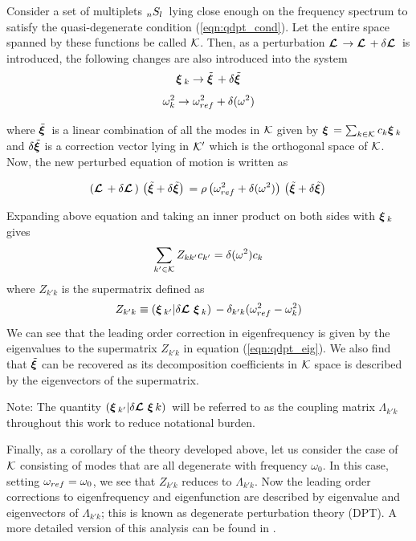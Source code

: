 Consider a set of multiplets $_{n}S_{l}\,$ lying close enough on the frequency spectrum to satisfy the quasi-degenerate condition (\ref{eqn:qdpt_cond}). Let the entire space spanned by these functions be called $\mathcal{K}$. Then, as a perturbation $\bm{\mathcal{L}}\, \rightarrow \bm{\mathcal{L}}\, + \delta\bm{\mathcal{L}}\,$ is introduced, the following changes are also introduced into the system
\begin{equation}
\bm{\xi}\,_k \rightarrow \tilde{\bm{\xi}\,} + \delta\tilde{\bm{\xi}}
\end{equation}
\begin{equation}
\omega_{k}^2 \rightarrow \omega_{ref}^2 + \delta(\omega^{2})
\end{equation}

where $\tilde{\bm{\xi}\,}$ is a linear combination of all the modes in $\mathcal{K}$ given by $\bm{\xi}\, = \sum_{k \in \mathcal{K}} c_k \bm{\xi}\,_{k}$ and $\delta \tilde{\bm{\xi}}$ is a correction vector lying in $\mathcal{K}'$ which is the orthogonal space of $\mathcal{K}$. Now, the new perturbed equation of motion is written as

\begin{equation}
\left( \bm{\mathcal{L}}\, + \delta \bm{\mathcal{L}}\, \right)\, \left( \tilde{\bm{\xi}} + \delta\tilde{\bm{\xi}} \right)\, = \rho \left( \omega_{ref}^2 + \delta(\omega^{2}) \right)\, \left( \tilde{\bm{\xi}} + \delta\tilde{\bm{\xi}} \right)\,
\end{equation}

Expanding above equation and taking an inner product on both sides with $\bm{\xi}\,_k$ gives
\begin{equation}\label{eqn:qdpt_eig}
\sum_{k'\in \mathcal{K}} Z_{kk'} c_{k'} = \delta(\omega^{2}) c_{k}
\end{equation}
where $Z_{k'k}$ is the supermatrix defined as 
\begin{equation}
Z_{k'k} \equiv (\bm{\xi}\,_{k'}|\delta \bm{\mathcal{L}}\,\,\bm{\xi}\,_{k})\, - \delta_{k'k} (\omega_{ref}^2 - \omega_{k}^2)
\end{equation}
We can see that the leading order correction in eigenfrequency is given by the eigenvalues to the supermatrix $Z_{k'k}$ in equation (\ref{eqn:qdpt_eig}). We also find that $\tilde{\bm{\xi}}$ can be recovered as its decomposition coefficients in $\mathcal{K}$ space is described by the eigenvectors of the supermatrix.

Note: The quantity $(\bm{\xi}\,_{k'}|\delta \bm{\mathcal{L}}\,\,\bm{\xi}\,{k})\,$ will be referred to as the coupling matrix $\Lambda_{k'k}$ throughout this work to reduce notational burden.

Finally, as a corollary of the theory developed above, let us consider the case of $\mathcal{K}$ consisting of modes that are all degenerate with frequency $\omega_0$. In this case, setting $\omega_{ref} = \omega_0$, we see that $Z_{k'k}$ reduces to $\Lambda_{k'k}$. Now the leading order corrections to eigenfrequency and eigenfunction are described by eigenvalue and eigenvectors of $\Lambda_{k'k}$; this is known as degenerate perturbation theory (DPT). A more detailed version of this analysis can be found in \cite{lavely92}.


